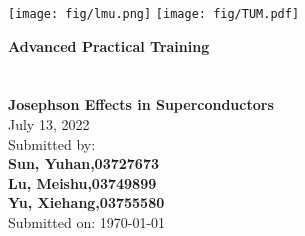 \begin{titlepage}

    \texttt{[image: fig/lmu.png]}
	\hspace*{\fill}
	\texttt{[image: fig/TUM.pdf]}

	\vspace*{1.8cm}
	\begin{center}
		\Huge \textbf{Advanced Practical Training}\\
		\Huge \textbf{}\\[0.4cm]
		\vspace*{\fill}
		\huge {} \\[0.15cm]
		\Huge \textbf{Josephson Effects in Superconductors} \\[0,7 cm] 
		\LARGE July 13, 2022\\
		\vspace*{\fill}
		\LARGE Submitted by:\\[0,3 cm]
		\LARGE \textbf{Sun, Yuhan,03727673} \\[0,3 cm]
		\LARGE \textbf{Lu, Meishu,03749899}\\[0,3 cm]
		\LARGE \textbf{Yu, Xiehang,03755580} \\[1,4 cm]
		\LARGE Submitted on: \today\\
	\end{center}
\end{titlepage}




